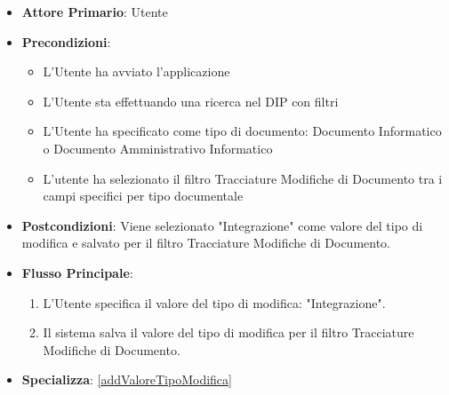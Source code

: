 \begin{itemize}
      \item \textbf{Attore Primario}: Utente
      \item \textbf{Precondizioni}: 
      \begin{itemize}            
            \item L'Utente ha avviato l'applicazione
            \item L'Utente sta effettuando una ricerca nel DIP con filtri
            \item L'Utente ha specificato come tipo di documento: Documento Informatico o Documento Amministrativo Informatico
            \item L'utente ha selezionato il filtro Tracciature Modifiche di Documento tra i campi specifici per tipo documentale
      \end{itemize}
      \item \textbf{Postcondizioni}: Viene selezionato "Integrazione" come valore del tipo di modifica e salvato per il filtro Tracciature Modifiche di Documento.
      \item \textbf{Flusso Principale}:
            \begin{enumerate}
                  \item L'Utente specifica il valore del tipo di modifica: "Integrazione".
                  \item Il sistema salva il valore del tipo di modifica per il filtro Tracciature Modifiche di Documento.
            \end{enumerate}
      \item \textbf{Specializza}: \ref{addValoreTipoModifica}
\end{itemize}

